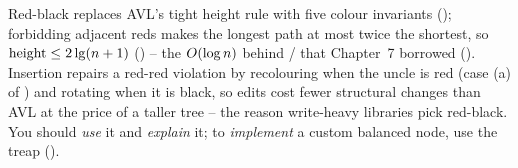 \begin{recallbox}
Red-black replaces AVL's tight height rule with five colour invariants (); forbidding
adjacent reds makes the longest path at most twice the shortest, so $\operatorname{height}\le 2\lg(n+1)$
() -- the $O(\log n)$ behind / that Chapter~7 borrowed
(). Insertion repairs a red-red violation by recolouring when the uncle is red (case (a)
of ) and rotating when it is black, so edits cost fewer structural changes than AVL at
the price of a taller tree -- the reason write-heavy libraries pick red-black. You should \emph{use} it and
\emph{explain} it; to \emph{implement} a custom balanced node, use the treap ().
\end{recallbox}
